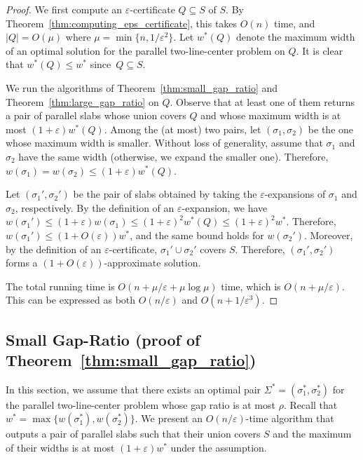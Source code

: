 \documentclass[10pt,a4paper]{article}
\theoremstyle{star}
\theoremstyle{claimstar}
\newcommand{\eps}{\ensuremath{\varepsilon}}
\begin{document}
\begin{proof}
    We first compute an $\eps$-certificate $Q\subseteq S$ of $S$. 
By Theorem~\ref{thm:computing_eps_certificate}, this takes $O(n)$ time, and $|Q| = O(\mu)$ where $\mu = \min \{n, 1/\eps^2\}$. 
Let $w^*(Q)$ denote the maximum width of an optimal solution for the parallel two-line-center problem on $Q$. It is clear that $w^*(Q) \le w^*$ since~$Q\subseteq S$. 

We run the algorithms of Theorem~\ref{thm:small_gap_ratio} and Theorem~\ref{thm:large_gap_ratio} on $Q$. 
Observe that at least one of them returns a pair of parallel slabs whose union covers $Q$ and whose maximum width is at most $(1+\eps)w^*(Q)$.
Among the (at most) two pairs, let $(\sigma_1, \sigma_2)$ be the one whose maximum width is smaller.
Without loss of generality, assume that $\sigma_1$ and $\sigma_2$ have the same width (otherwise, we expand the smaller one). Therefore, $w(\sigma_1) = w(\sigma_2) \le (1+\eps)w^*(Q)$.

Let $(\sigma_1', \sigma_2')$ be the pair of slabs obtained by taking the $\eps$-expansions of $\sigma_1$ and $\sigma_2$, respectively.  
By the definition of an $\eps$-expansion, we have $w(\sigma_1') \le (1+\eps)w(\sigma_1) \le (1+\eps)^2w^*(Q) \le (1+\eps)^2w^*$. 
Therefore, $w(\sigma_1')\le (1+O(\eps)) w^*$, and the same bound holds for $w(\sigma_2')$.
Moreover, by the definition of an $\eps$-certificate, $\sigma_1' \cup \sigma_2'$ covers $S$.  
Therefore, $(\sigma_1', \sigma_2')$ forms a $(1+O(\eps))$-approximate solution.

The total running time is $O(n + \mu/\eps + \mu \log \mu)$ time, which is $O(n + \mu /\eps)$. 
This can be expressed as both $O(n/\eps)$ and $O(n + 1/\eps^3)$.
\end{proof}





\subsection{Small Gap-Ratio (proof of Theorem~\ref{thm:small_gap_ratio})}
\label{sec:small_gap_ratio}
In this section, we assume that there exists an optimal pair $\Sigma^* = (\sigma_1^*, \sigma_2^*)$ for the parallel two-line-center problem whose gap ratio is at most $\rho$. 
Recall that $w^* = \max \{w(\sigma_1^*), w(\sigma_2^*) \}$.
We present an $O(n/\eps)$-time algorithm that outputs a pair of parallel slabs such that their union covers $S$ and the maximum of their widths is at most $(1+\eps)w^*$ under the assumption.
\end{document}

